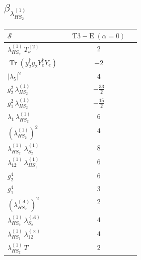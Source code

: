 \documentclass[9pt]{article}
\begin{document}
\subsection*{$ \beta_{\lambda_{HS_2}^{(1)}} $}
\begin{longtable}{@{}p{0.31\linewidth}c@{}}
\toprule
$\mathcal{S}$ & $ \mathrm{T3-E}\;(\alpha=0) $ \\
\midrule
$ \lambda_{HS_2}^{(1)}\,T_{\nu}^{(2)} $ & $ 2 $ \\
$ \operatorname{Tr}(y_2^\dagger y_2Y_e^\dagger Y_e) $ & $ -2 $ \\
$ |\lambda_5|^2 $ & $ 4 $ \\
$ g_2^2\,\lambda_{HS_2}^{(1)} $ & $ - \frac{33}{2} $ \\
$ g_1^2\,\lambda_{HS_2}^{(1)} $ & $ - \frac{15}{2} $ \\
$ \lambda_1\,\lambda_{HS_2}^{(1)} $ & $ 6 $ \\
$ \left(\lambda_{HS_2}^{(1)}\right)^2 $ & $ 4 $ \\
$ \lambda_{HS_2}^{(1)}\,\lambda_{S_2}^{(1)} $ & $ 8 $ \\
$ \lambda_{12}^{(1)}\,\lambda_{HS_1}^{(1)} $ & $ 6 $ \\
$ g_2^4 $ & $ 6 $ \\
$ g_1^4 $ & $ 3 $ \\
$ \left(\lambda_{HS_2}^{(A)}\right)^2 $ & $ 2 $ \\
$ \lambda_{HS_2}^{(1)}\,\lambda_{S_2}^{(A)} $ & $ 4 $ \\
$ \lambda_{HS_1}^{(1)}\,\lambda_{12}^{(\times)} $ & $ 4 $ \\
$ \lambda_{HS_2}^{(1)}\,T $ & $ 2 $ \\
\bottomrule
\end{longtable}
\end{document}
